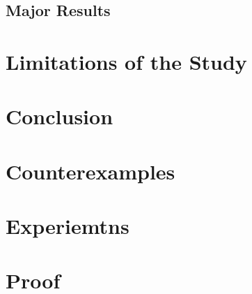 \documentclass[letterpaper]{article} %
\begin{document}
\subsection{Major Results}



\section{Limitations of the Study}

\section{Conclusion}



\appendix
\section{Counterexamples}
\section{Experiemtns}
\section{Proof}
\end{document}
